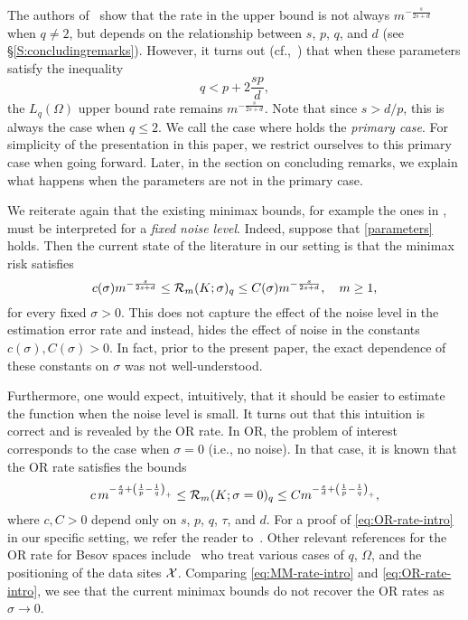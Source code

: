    
   The authors of~\cite{DeJu}  show that  the   rate in the upper bound  is not always $m^{-\frac{s}{2s+d}}$ when $q \neq 2$, but  depends on the relationship between $s$, $p$, $q$, and $d$ (see \S \ref{S:concludingremarks}). However, it turns out (cf.,~\cite[Theorem~4]{DeJu}) that when these parameters satisfy the inequality
\begin{equation}
\label{parameters} 
 q<p+2\frac{sp}{d},
\end{equation}
the $L_q(\Omega)$ upper bound rate remains $m^{-\frac{s}{2s+d}}$.  Note that since $s>d/p$,
this is always the case when $q\le 2$.  We call the case
where  holds the {\it primary case}.  For simplicity of the presentation in this paper, we restrict ourselves to this primary case when going forward.
 Later, in the section on concluding remarks, we explain what happens when the parameters are not in the primary case.

We reiterate again that the existing minimax bounds, for example the ones in  \cite{DJ,DeJu},  must be interpreted for a \emph{fixed noise level}.
Indeed, suppose that \eqref{parameters} holds.
Then the current state of the literature in our setting is that the minimax risk satisfies
\begin{equation}
    c(\sigma) m^{-\frac{s}{2s + d}} \leq  {\cal R}_m(K;\sigma)_q\leq   C(\sigma) m^{-\frac{s}{2s + d}},\quad m\ge 1,
    \label{eq:MM-rate-intro}
\end{equation}
for every fixed $\sigma > 0$. This does not capture the effect of the noise level in the estimation error rate and instead, hides the effect of noise in the constants $c(\sigma), C(\sigma) > 0$. In fact, prior to the present paper, the exact dependence of these constants on $\sigma$ was  not well-understood.

Furthermore, one would expect, intuitively, that it should be easier to estimate the function when the noise level is small. It turns out that this intuition is correct and is revealed by the OR rate. In OR, the problem of interest corresponds to the case when $\sigma = 0$ (i.e., no noise). In that case, it is known that the OR rate satisfies the bounds
\begin{equation}
    c\, m^{-\frac{s}{d} + \left( \frac{1}{p} - \frac{1}{q}\right)_+} \leq  {\cal R}_m(K;\sigma = 0)_q\leq   C m^{-\frac{s}{d} + \left( \frac{1}{p} - \frac{1}{q}\right)_+},
    \label{eq:OR-rate-intro}
\end{equation}
where $c, C > 0$ depend only on $s$, $p$, $q$, $\tau$, and $d$. For a proof of \eqref{eq:OR-rate-intro} in our specific setting, we refer the reader to~\cite{BDPS}. Other relevant references for the OR rate for Besov spaces include~\cite{NT,V, KNS} who treat various cases of $q$, $\Omega$, and the positioning of the data sites ${\cal X}$. Comparing \eqref{eq:MM-rate-intro} and \eqref{eq:OR-rate-intro}, we see that the current minimax bounds do not recover the OR rates  as $\sigma \to 0$.





